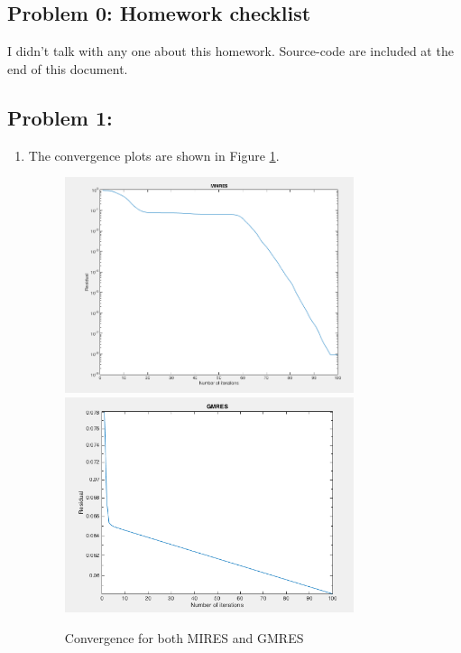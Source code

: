 \documentclass{article}
\begin{document}
 



\hypertarget{problem_0_homework_checklist_2}{}
\subsection*{{Problem 0: Homework checklist}}
\label{}

\checkmark	I didn't talk with any one about this homework. \newline
\checkmark 	Source-code are included at the end of this document. 

\hypertarget{}{}
\subsection*{{Problem 1: }}
\label{}


\begin{enumerate} 
\item 

The convergence plots are shown in Figure \ref{fig:problem1_1}.  

\begin{figure} 
\includegraphics[width=0.8\textwidth]{MIRES} 
\includegraphics[width=0.8\textwidth]{GMRES} 
\label{fig:problem1_1}
\center
\caption{Convergence for both MIRES and GMRES} 
\end{figure}


\end{enumerate}
\end{document}
